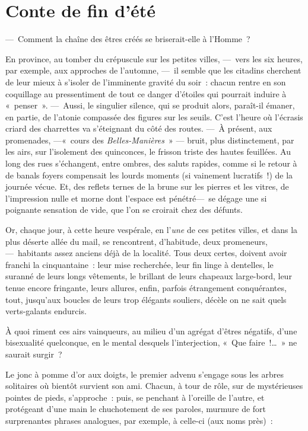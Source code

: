 \documentclass[french,twoside]{book} %
\newcommand{\bibl}[1]{{\RaggedLeft{#1}\par\bigskip}}
\newcommand{\salute}[1]{\bigbreak{#1}\par\medbreak}
\begin{document}
 \section[{Conte de fin d’été}]{Conte de fin d’été}\renewcommand{\leftmark}{Conte de fin d’été}


\salute{À Monsieur René Baschet}
\noindent — Comment la chaîne des êtres créés se briserait-elle à l’Homme ?\par

\bibl{Les Platoniciens du XII\textsuperscript{e} siècle.}
\noindent En province, au tomber du crépuscule sur les petites villes, — vers les six heures, par exemple, aux approches de l’automne, — il semble que les citadins cherchent de leur mieux à s’isoler de l’imminente gravité du soir : chacun rentre en son coquillage au pressentiment de tout ce danger d’étoiles qui pourrait induire à « penser ». — Aussi, le singulier silence, qui se produit alors, paraît-il émaner, en partie, de l’atonie compassée des figures sur les seuils. C’est l’heure où l’écrasis criard des charrettes va s’éteignant du côté des routes. — À présent, aux promenades, —« cours des \emph{Belles-Manières} » —  bruit, plus distinctement, par les airs, sur l’isolement des quinconces, le frisson triste des hautes feuillées. Au long des rues s’échangent, entre ombres, des saluts rapides, comme si le retour à de banals foyers compensait les lourds moments (si vainement lucratifs !) de la journée vécue. Et, des reflets ternes de la brune sur les pierres et les vitres, de l’impression nulle et morne dont l’espace est pénétré— se dégage une si poignante sensation de vide, que l’on se croirait chez des défunts.\par
Or, chaque jour, à cette heure vespérale, en l’\emph{une} de ces petites villes, et dans la plus déserte allée du mail, se rencontrent, d’habitude, deux promeneurs, — habitants assez anciens déjà de la localité. Tous deux certes, doivent avoir franchi la cinquantaine : leur mise recherchée, leur fin linge à dentelles, le suranné de leurs longs vêtements, le brillant de leurs chapeaux large-bord, leur tenue encore fringante, leurs allures, enfin, parfois étrangement conquérantes, tout, jusqu’aux boucles de leurs trop élégants souliers, décèle on ne sait quels verts-galants endurcis.\par
   À quoi riment ces airs vainqueurs, au milieu d’un agrégat d’êtres négatifs, d’une bisexualité quelconque, en le mental desquels l’interjection, « Que faire !… » ne saurait surgir ?\par
Le jonc à pomme d’or aux doigts, le premier advenu s’engage sous les arbres solitaires où bientôt survient son ami. Chacun, à tour de rôle, sur de mystérieuses pointes de pieds, s’approche : puis, se penchant à l’oreille de l’autre, et protégeant d’une main le chuchotement de ses paroles, murmure de fort surprenantes phrases analogues, par exemple, à celle-ci (aux noms près) :\par
\end{document}
